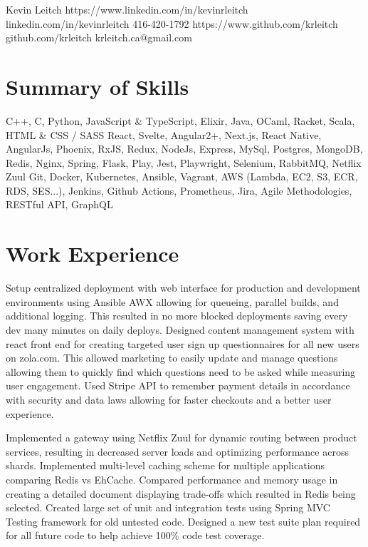 \documentclass{my_resume}
\begin{document}

\myhead
{Kevin Leitch}
{https://www.linkedin.com/in/kevinrleitch}
{linkedin.com/in/kevinrleitch}
{416-420-1792}
{https://www.github.com/krleitch}
{github.com/krleitch}
{krleitch.ca@gmail.com}

\section{Summary of Skills}
{C++, C, Python, JavaScript \& TypeScript, Elixir, Java, OCaml, Racket, Scala, HTML \& CSS / SASS}
{React, Svelte, Angular2+, Next.js, React Native, AngularJs, Phoenix, RxJS, Redux, NodeJs, Express, MySql, Postgres,
 MongoDB, Redis, Nginx, Spring, Flask, Play, Jest, Playwright, Selenium, RabbitMQ, Netflix Zuul}
{Git, Docker, Kubernetes, Ansible, Vagrant, AWS (Lambda, EC2, S3, ECR, RDS, SES...),
 Jenkins, Github Actions, Prometheus, Jira, Agile Methodologies, RESTful API, GraphQL}

\section{Work Experience}

\workitemsthree
{Setup centralized deployment with web interface for production and development environments using Ansible AWX allowing for queueing, parallel builds, and additional logging. This resulted in no more blocked deployments saving every dev many minutes on daily deploys.}
{Designed content management system with react front end for creating targeted user sign up questionnaires for all new users on zola.com. This allowed marketing to easily update and manage questions allowing them to quickly find which questions need to be asked while measuring user engagement.}
{Used Stripe API to remember payment details in accordance with security and data laws allowing for faster checkouts and a better user experience.}

\workitemsthree
{Implemented a gateway using Netflix Zuul for dynamic routing between product services,
 resulting in decreased server loads and optimizing performance across shards.}
{Implemented multi-level caching scheme for multiple applications comparing Redis vs EhCache. Compared performance and memory usage in creating a detailed document displaying trade-offs which resulted in Redis being selected.}
{Created large set of unit and integration tests using Spring MVC Testing framework for old untested code.
 Designed a new test suite plan required for all future code to help achieve 100\% code test coverage.}
\end{document}

